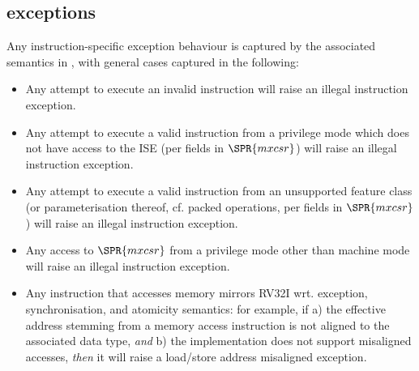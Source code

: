 \subsection{\XCID exceptions}
\label{sec:spec:exceptions}


Any instruction-specific exception behaviour is captured by the associated
semantics in , with general cases captured in
the following:

\begin{itemize}
\item Any attempt to execute an
      invalid \XCID instruction
      will raise an 
      illegal instruction exception.
\item Any attempt to execute a
        valid \XCID instruction
      from a privilege mode which does not have access to the ISE
      (per fields in $\SPR{mxcsr}$)
      will raise an
      illegal instruction exception.
\item Any attempt to execute a
        valid \XCID instruction
      from an unsupported feature class (or parameterisation thereof, cf. packed operations, per fields in $\SPR{mxcsr}$)
      will raise an 
      illegal instruction exception.
\item Any access to
      $\SPR{mxcsr}$
      from a privilege mode other than machine mode
      will raise an 
      illegal instruction exception.
\item Any instruction that accesses memory mirrors RV32I wrt. exception,
      synchronisation, and atomicity semantics: for example, if
      a) the effective address stemming from a memory access instruction
         is not aligned to the associated data type, 
         {\em  and}
      b) the implementation does not support misaligned accesses,
         {\em then} it 
      will raise a 
      load/store address misaligned exception.
\end{itemize}


